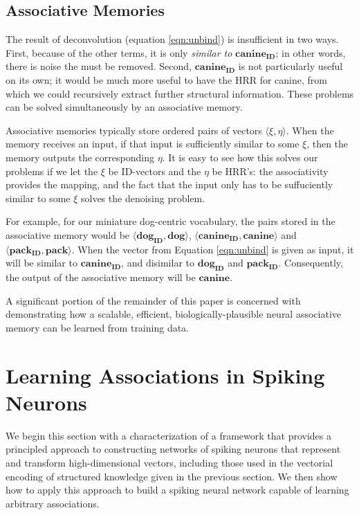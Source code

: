 \documentclass[10pt,letterpaper]{article}
\begin{document}
\subsection{Associative Memories}
The result of deconvolution (equation \eqref{eqn:unbind}) is insufficient in two ways. First, because of the other terms, it is only \textit{similar to} $\mathbf{canine_{ID}}$; in other words, there is noise the must be removed. Second, $\mathbf{canine_{ID}}$ is not particularly useful on its own; it would be much more useful to have the HRR for canine, from which we could recursively extract further structural information. These problems can be solved simultaneously by an associative memory.

Associative memories typically store ordered pairs of vectors $\langle\xi, \eta\rangle$. When the memory receives an input, if that input is sufficiently similar to some $\xi$, then the memory outputs the corresponding $\eta$. It is easy to see how this solves our problems if we let the $\xi$ be ID-vectors and the $\eta$ be HRR's: the associativity provides the mapping, and the fact that the input only has to be suffuciently similar to some $\xi$ solves the denoising problem. 

For example, for our miniature dog-centric vocabulary, the pairs stored in the associative memory would be $\langle\mathbf{dog_{ID}}, \mathbf{dog}\rangle$, $\langle\mathbf{canine_{ID}}, \mathbf{canine}\rangle$ and $\langle\mathbf{pack_{ID}}, \mathbf{pack}\rangle$. When the vector from Equation \eqref{eqn:unbind} is given as input, it will be similar to $\mathbf{canine_{ID}}$, and disimilar to $\mathbf{dog_{ID}}$ and $\mathbf{pack_{ID}}$. Consequently, the output of the associative memory will be $\mathbf{canine}$.

A significant portion of the remainder of this paper is concerned with demonstrating how a scalable, efficient, biologically-plausible neural associative memory can be learned from training data.

\section{Learning Associations in Spiking Neurons}
We begin this section with a characterization of a framework that provides a principled approach to constructing networks of spiking neurons that represent and transform high-dimensional vectors, including those used in the vectorial encoding of structured knowledge given in the previous section. We then show how to apply this approach to build a spiking neural network capable of learning arbitrary associations.
\end{document}
